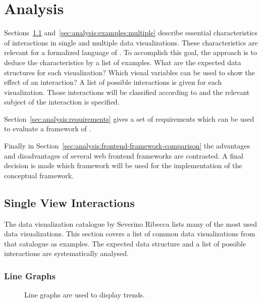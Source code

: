 \chapter{Analysis}\label{sec:analysis}
Sections~\ref{sec:analysis:examples:single} and~\ref{sec:analysis:examples:multiple} describe essential characteristics of interactions in single and multiple data visualizations.
These characteristics are relevant for a formalized language of \cmvs{}.
To accomplish this goal, the approach is to deduce the characteristics by a list of examples.
What are the expected data structures for each visualization?
Which visual variables can be used to show the effect of an interaction?
A list of possible interactions is given for each visualization.
Those interactions will be classified according to \textcite{Yi2007} and the relevant subject of the interaction is specified.

Section~\ref{sec:analysis:requirements} gives a set of requirements which can be used to evaluate a framework of \cmvs{}.

Finally in Section~\ref{sec:analysis:frontend-framework-comparison} the advantages and disadvantages of several web frontend frameworks are contrasted.
A final decision is made which framework will be used for the implementation of the conceptual framework.

\section{Single View Interactions}\label{sec:analysis:examples:single}

The data visualization catalogue by Severino Ribecca lists many of the most used data visualizations\parencite{VisualizationCatalogue2017}.
This section covers a list of common data visualizations from that catalogue as examples.
The expected data structure and a list of possible interactions are systematically analysed.

\subsection{Line Graphs}
\begin{figure}
  \begin{center}
    \qquad
  \caption{Line graphs are used to display trends.}
  \label{fig:analysis:line-graphs}
  \end{center}
\end{figure}

